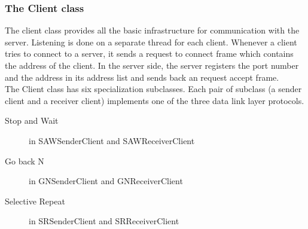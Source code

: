 \documentclass[14pt,titlepage, a4paper]{extarticle}
\begin{document}
\subsubsection{The Client class}
The client class provides all the basic infrastructure
for communication with the server. Listening is done on a separate
thread for each client. Whenever a client tries to connect to a server,
it sends a request to connect frame which contains the address of the client.
In the server side, the server registers the port number and the address in its
address list and sends back an request accept frame.
\\
The Client class has six specialization subclasses.
Each pair of subclass (a sender client and a receiver client) implements
one of the three data link layer protocols.
\begin{description}
	\item [Stop and Wait] in  SAWSenderClient and SAWReceiverClient
	\item [Go back N] in GNSenderClient and GNReceiverClient
	\item [Selective Repeat] in SRSenderClient and SRReceiverClient
\end{description}

\end{document}
